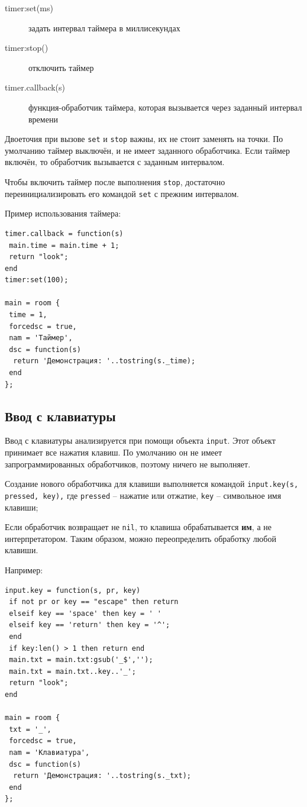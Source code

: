\documentclass[a4paper,12pt]{article}
\begin{document}
\begin{description}
\item[timer:set(ms)] задать интервал таймера в миллисекундах
\item[timer:stop()] отключить таймер
\item[timer.callback(s)] функция-обработчик таймера, которая вызывается через заданный интервал времени
\end{description}

Двоеточия при вызове \verb/set/ и \verb/stop/ важны, их не стоит заменять на точки. По умолчанию таймер выключён, и не имеет заданного обработчика. Если таймер включён, то обработчик вызывается с заданным интервалом.

Чтобы включить таймер после выполнения \verb/stop/, достаточно переинициализировать его командой \verb/set/ с прежним интервалом.

Пример использования таймера: 

\begin{verbatim}
timer.callback = function(s) 
 main.time = main.time + 1;   
 return "look"; 
end 
timer:set(100); 

main = room { 
 time = 1, 
 forcedsc = true, 
 nam = 'Таймер', 
 dsc = function(s) 
  return 'Демонстрация: '..tostring(s._time); 
 end
}; 
\end{verbatim}

\subsection{Ввод с клавиатуры}
\label{objects_input}
Ввод с клавиатуры анализируется при помощи объекта \verb/input/. Этот объект принимает все нажатия клавиш. По умолчанию он не имеет запрограммированных обработчиков, поэтому ничего не выполняет.

Создание нового обработчика для клавиши выполняется командой \verb/input.key(s, pressed, key),/ где \verb/pressed/ -- нажатие или отжатие, \verb/key/ -- символьное имя клавиши;

Если обработчик возвращает не \verb/nil/, то клавиша обрабатывается \textbf{им}, а не интерпретатором. Таким образом, можно переопределить обработку любой клавиши.

Например: 

\begin{verbatim}
input.key = function(s, pr, key) 
 if not pr or key == "escape" then return  
 elseif key == 'space' then key = ' '  
 elseif key == 'return' then key = '^'; 
 end  
 if key:len() > 1 then return end  
 main.txt = main.txt:gsub('_$',''); 
 main.txt = main.txt..key..'_'; 
 return "look"; 
end

main = room { 
 txt = '_', 
 forcedsc = true, 
 nam = 'Клавиатура', 
 dsc = function(s) 
  return 'Демонстрация: '..tostring(s._txt); 
 end  
}; 
\end{verbatim}
\end{document}
